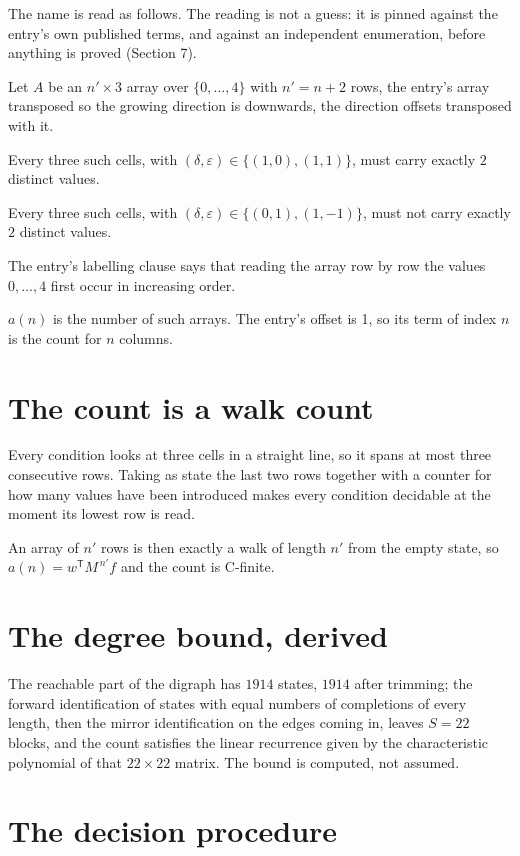 \documentclass[11pt]{article}
\theoremstyle{definition}
\begin{document}
The name is read as follows. The reading is not a guess: it is pinned against the entry's own published terms, and against an independent enumeration, before anything is proved (Section 7).

Let $A$ be an $n' \times 3$ array over $\{0,\dots,4\}$ with $n' = n + 2$ rows, the entry's array transposed so the growing direction is downwards, the direction offsets transposed with it.

Every three such cells, with $(\delta,\varepsilon) \in \{(1,0), (1,1)\}$, must carry exactly $2$ distinct values.

Every three such cells, with $(\delta,\varepsilon) \in \{(0,1), (1,-1)\}$, must not carry exactly $2$ distinct values.

The entry's labelling clause says that reading the array row by row the values $0,\dots,4$ first occur in increasing order.

$a(n)$ is the number of such arrays. The entry's offset is 1, so its term of index $n$ is the count for $n$ columns.

\section{The count is a walk count}

Every condition looks at three cells in a straight line, so it spans at most three consecutive rows. Taking as state the last two rows together with a counter for how many values have been introduced makes every condition decidable at the moment its lowest row is read.

An array of $n'$ rows is then exactly a walk of length $n'$ from the empty state, so $a(n) = w^{\mathsf T}M^{\,n'}f$ and the count is C-finite.

\section{The degree bound, derived}

The reachable part of the digraph has $1914$ states, $1914$ after trimming; the forward identification of states with equal numbers of completions of every length, then the mirror identification on the edges coming in, leaves $S = 22$ blocks, and the count satisfies the linear recurrence given by the characteristic polynomial of that $22\times22$ matrix. The bound is computed, not assumed.

\section{The decision procedure}
\end{document}
